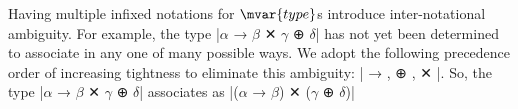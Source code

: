 Having multiple infixed notations for $\mvar{type}$s introduce inter-notational ambiguity.
For example, the type \code|$α$ → $β$ ✕ $γ$ ⊕ $δ$| has not yet been determined to associate in any one of many possible ways.
We adopt the following precedence order of increasing tightness to eliminate this ambiguity: \code| → , ⊕ , ✕ |.
So, the type \code|$α$ → $β$ ✕ $γ$ ⊕ $δ$| associates as \code|($α$ → $β$) ✕ ($γ$ ⊕ $δ$)|
